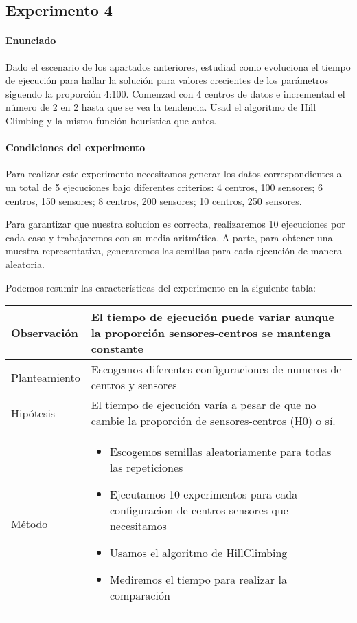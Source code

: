 \subsection{Experimento 4}

\paragraph{Enunciado}

Dado el escenario de los apartados anteriores, estudiad como evoluciona el 
tiempo de ejecución para hallar la solución para valores crecientes de los 
parámetros siguendo la proporción 4:100. Comenzad con 4 centros de datos e
incrementad el número de 2 en 2 hasta que se vea la tendencia. Usad el
algoritmo de Hill Climbing y la misma función heurística que antes.

\paragraph{Condiciones del experimento}

Para realizar este experimento necesitamos generar los datos correspondientes
a un total de 5 ejecuciones bajo diferentes criterios: 4 centros, 100 sensores;
6 centros, 150 sensores; 8 centros, 200 sensores; 10 centros, 250 sensores.

Para garantizar que nuestra solucion es correcta, realizaremos 10 ejecuciones
por cada caso y trabajaremos con su media aritmética. A parte, para obtener una
muestra representativa, generaremos las semillas para cada ejecución de manera
aleatoria.

Podemos resumir las características del experimento en la siguiente tabla:

\begin{tabular}{ | p{} | p{} | }
  \hline
  Observación & El tiempo de ejecución puede variar aunque la proporción
  sensores-centros se mantenga constante\\
  \hline
  Planteamiento & Escogemos diferentes configuraciones de numeros de centros
  y sensores \\
  \hline
  Hipótesis & El tiempo de ejecución varía a pesar de que no cambie la 
  proporción de sensores-centros (H0) o sí.\\
  \hline
  Método & 
    \begin{itemize}
      \item Escogemos semillas aleatoriamente para todas las repeticiones
      \item Ejecutamos 10 experimentos para cada configuracion de centros
        sensores que necesitamos
      \item Usamos el algoritmo de HillClimbing 
      \item Mediremos el tiempo para realizar la comparación
    \end{itemize}
    \\
  \hline
\end{tabular}


